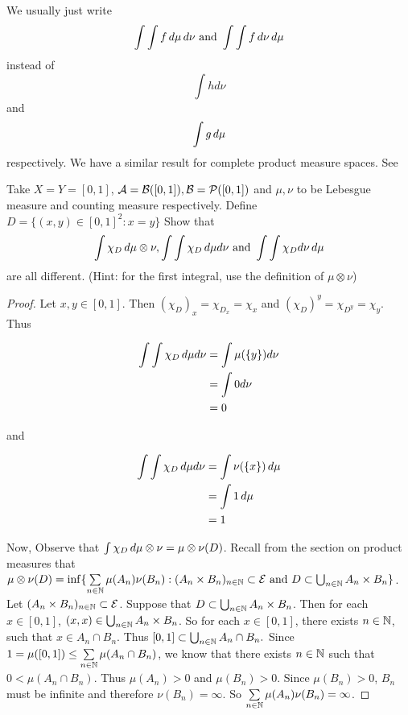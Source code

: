 \documentclass{book}
\begin{document}
	\begin{note}
		We usually just write $$\int \int f \, d \mu \, d \nu \text{ and } \int \int f \, d \nu \, d \mu$$ instead of $$\int h d\nu$$ and $$\int g \, d \mu $$ respectively. We have a similar result for complete product measure spaces. See 
	\end{note}
	
	\begin{ex}  
		Take $X=Y= [0,1]$, $\mathcal{A} = \mathcal{B}([0,1]), \mathcal{B} = \mathcal{P}([0,1])$ and $\mu,\nu$ to be Lebesgue measure and counting measure respectively. Define $D = \{(x,y) \in [0,1]^2: x=y\}$ Show that $$\int \chi_D \, d \mu \otimes \nu, \int \int \chi_D \, d \mu d \nu \text{ and } \int \int \chi_D d\nu \, d \mu$$ are all different. (Hint: for the first integral, use the definition of $\mu \otimes \nu$)
	\end{ex}
	
	\begin{proof}
		Let $x,y \in [0,1]$. Then $(\chi_D)_x = \chi_{D_x} = \chi_{x}$ and $(\chi_D)^y = \chi_{D^y} = \chi_{y}$. Thus
		
		\begin{align*}
			\int \int \chi_D \, d \mu d \nu
			&= \int \mu(\{y\}) d\nu\\
			&= \int 0 d\nu\\
			&= 0
		\end{align*}
		
		and
		
		\begin{align*}
			\int \int \chi_D \, d \mu d \nu
			&= \int \nu(\{x\}) \, d \mu\\
			&= \int 1 \, d \mu\\
			&= 1
		\end{align*}
		
		Now, Observe that $\int \chi_D \, d \mu \otimes \nu = \mu \otimes \nu(D)$. Recall from the section on product measures that $\mu \otimes \nu(D) = \inf \{\sum\limits_{n \in \mathbb{N}}\mu(A_n)\nu(B_n): (A_n \times B_n)_{n \in \mathbb{N}} \subset \mathcal{E} \text{ and } D \subset \bigcup_{n \in \mathbb{N}} A_n \times B_n \}$. Let $(A_n \times B_n)_{n \in \mathbb{N}} \subset \mathcal{E}$. Suppose that $D \subset \bigcup_{n \in \mathbb{N}}A_n \times B_n$. Then for each $x \in [0,1]$, $(x,x) \in  \bigcup_{n \in \mathbb{N}} A_n \times B_n$. So for each $x \in [0,1]$, there exists $n \in \mathbb{N}$, such that $x \in A_n \cap B_n$. Thus $[0,1] \subset \bigcup_{n \in \mathbb{N}} A_n \cap B_n.$ Since $1  = \mu([0,1]) \leq \sum\limits_{n \in \mathbb{N}}\mu(A_n \cap B_n)$, we know that there exists $n \in \mathbb{N}$ such that $0 < \mu(A_n \cap B_n)$. Thus $\mu(A_n)> 0$ and $\mu(B_n) > 0$. Since $\mu(B_n) > 0$, $B_n$ must be infinite and therefore $\nu(B_n) = \infty$. So $\sum\limits_{n \in \mathbb{N}} \mu(A_n)\nu(B_n) = \infty$.
		
	\end{proof}
	
\end{document}
